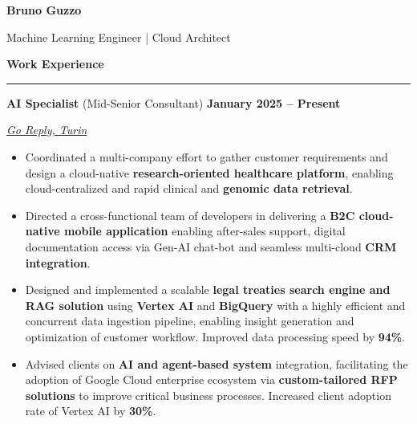 \documentclass[9pt, a4paper]{article}
\newcommand{\cvsection}[1]{%
	\vspace{2pt}\par
	{\Large\bfseries\color{sectionblue}#1}\par
	\vspace{2pt}\hrule\vspace{6pt}
}
\newcommand{\jobsection}[3]{%
	\par {\large #1} \hfill {\bfseries #2} \par {\textit{#3}} \vspace{4pt}
}
\begin{document}
	
	\begin{center}
		{\Huge\bfseries Bruno Guzzo}\par
		\vspace{4pt}
		{\Large Machine Learning Engineer | Cloud Architect}
	\end{center}
	
	\begin{minipage}[t]{0.65\linewidth}
		\vspace{0pt} %
		
		\cvsection{Work Experience}
		
		\jobsection{\textbf{AI Specialist} (Mid-Senior Consultant)}{January 2025 -- Present}{\href{https://www.reply.com/go-reply/en}{Go Reply, Turin}}
		
		\begin{itemize}[leftmargin=*, nosep]
			\item \footnotesize Coordinated a multi-company effort to gather customer requirements and design a cloud-native \textbf{research-oriented healthcare platform}, enabling cloud-centralized and rapid clinical and \textbf{genomic data retrieval}.     
			
			\vspace{2pt}
			\item \footnotesize Directed a cross-functional team of developers in delivering a \textbf{B2C cloud-native mobile application} enabling after-sales support, digital documentation access via Gen-AI chat-bot and seamless multi-cloud \textbf{CRM integration}.   
			
			\vspace{2pt}
			\item \footnotesize Designed and implemented a scalable \textbf{legal treaties search engine and RAG solution} using \textbf{Vertex AI} and \textbf{BigQuery} with a highly efficient and concurrent data ingestion pipeline, enabling insight generation and optimization of customer workflow. 
			Improved data processing speed by \textbf{94\%}.  
			
			\vspace{2pt}		
			\item \footnotesize Advised clients on \textbf{AI and agent-based system} integration, facilitating the adoption of Google Cloud enterprise ecosystem via \textbf{custom-tailored RFP solutions} to improve critical business processes.
			Increased client adoption rate of Vertex AI by \textbf{30\%}.  
			

\end{itemize}
\end{minipage}
\end{document}
